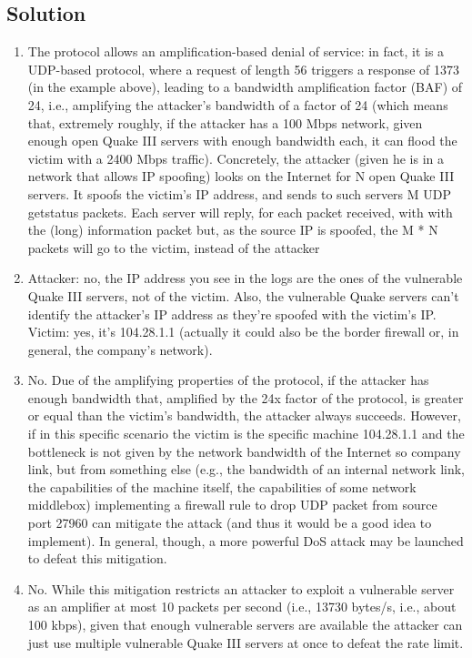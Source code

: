 \subsection*{Solution}
\begin{enumerate}
    \item The protocol allows an amplification-based denial of service: in fact, it is a UDP-based protocol, where a request of length 56 triggers a response of 1373 (in the example above), leading to a bandwidth amplification factor (BAF) of 24, i.e., amplifying the attacker's bandwidth of a factor of 24 (which means that, extremely roughly, if the attacker has a 100 Mbps network, given enough open Quake III servers with enough bandwidth each, it can flood the victim with a 2400 Mbps traffic).
        Concretely, the attacker (given he is in a network that allows IP spoofing) looks on the Internet for N open Quake III servers. 
        It spoofs the victim's IP address, and sends to such servers M UDP getstatus packets. 
        Each server will reply, for each packet received, with with the (long) information packet but, as  the source IP is spoofed, the M * N packets will go to the victim, instead of the attacker
    \item Attacker: no, the IP address you see in the logs are the ones of the vulnerable Quake III servers, not of the victim. 
        Also, the vulnerable Quake servers can't identify the attacker's IP address as they're spoofed with the victim's IP.
        Victim: yes, it's 104.28.1.1 (actually it could also be the border firewall or, in general, the company's network). 
    \item No. 
        Due of the amplifying properties of the protocol, if the attacker has enough bandwidth that, amplified by the 24x factor of the protocol, is greater or equal than the victim's bandwidth, the attacker always succeeds.
        However, if in this specific scenario the victim is the specific machine 104.28.1.1 and the bottleneck is not given by the network bandwidth of the Internet so company link, but from something else (e.g., the bandwidth of an internal network link, the capabilities of the machine itself, the capabilities of some network middlebox) implementing a firewall rule to drop UDP packet from source port 27960 can mitigate the attack (and thus it would be a good idea to implement).
        In general, though, a more powerful DoS attack may be launched to defeat this mitigation.
    \item No. 
        While this mitigation restricts an attacker to exploit a vulnerable server as an amplifier at most 10 packets per second (i.e., 13730 bytes/s, i.e., about 100 kbps), given that enough vulnerable servers are available the attacker can just use multiple vulnerable Quake III servers at once to defeat the rate limit.

\end{enumerate}
